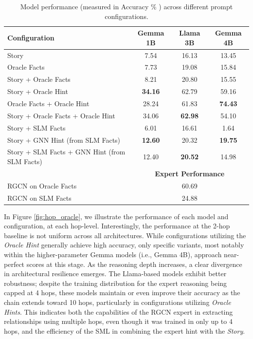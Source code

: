\documentclass[
]{ceurart}
\begin{document}
\begin{table}[htbp]
\centering
\caption{Model performance (measured in Accuracy \% ) across different prompt configurations.}
\label{tab:configuration_results}
\begin{tabular}{lccc}
\toprule
\textbf{Configuration} & \textbf{Gemma 1B} & \textbf{Llama 3B} & \textbf{Gemma 4B} \\
\midrule
Story & 7.54 & 16.13 & 13.45 \\
Oracle Facts & 7.73 & 19.08 & 15.84 \\
Story + Oracle Facts & 8.21 & 20.80 & 15.55 \\
Story + Oracle Hint & \textbf{34.16} & 62.79 & 59.16 \\
Oracle Facts + Oracle Hint & 28.24 & 61.83 & \textbf{74.43} \\
Story + Oracle Facts + Oracle Hint & 34.06 & \textbf{62.98} & 54.10 \\

\midrule
Story + SLM Facts & 6.01 & 16.61 & 1.64 \\
Story + GNN Hint (from SLM Facts) & \textbf{12.60} & 20.32 & \textbf{19.75} \\
Story + SLM Facts + GNN Hint (from SLM Facts) & 12.40 & \textbf{20.52} & 14.98 \\
\midrule
 & \multicolumn{3}{c}{\textbf{Expert Performance}} \\
RGCN on Oracle Facts & \multicolumn{3}{c}{60.69} \\
RGCN on SLM Facts & \multicolumn{3}{c}{24.88} \\
\bottomrule
\end{tabular}
\end{table}

\noindent In Figure \ref{fig:hop_oracle}, we illustrate the performance of each model and configuration, at each hop-level. Interestingly, the performance at the 2-hop baseline is not uniform across all architectures. While configurations utilizing the \textit{Oracle Hint} generally achieve high accuracy, only specific variants, most notably within the higher-parameter Gemma models (i.e., Gemma 4B), approach near-perfect scores at this stage. As the reasoning depth increases, a clear divergence in architectural resilience emerges. The Llama-based models exhibit better robustness; despite the training distribution for the expert reasoning being capped at 4 hops, these models maintain or even improve their accuracy as the chain extends toward 10 hops, particularly in configurations utilizing \textit{Oracle Hints}. This indicates both the capabilities of the RGCN expert in extracting relationships using multiple hops, even though it was trained in only up to 4 hops, and the efficiency of the SML in combining the expert hint with the \textit{Story}.
\end{document}
